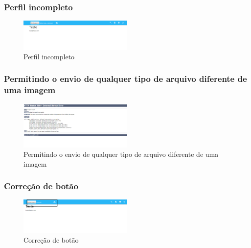 \pagebreak

\subsubsection{Perfil incompleto}
\begin{figure}[ht]
	\centering
	\includegraphics[width=0.5\textwidth]{./imagens/perfil_desarrumado.png}
	\caption{Perfil incompleto}
	\label{fig:casoDeUso}
\end{figure}

\pagebreak

\subsubsection{Permitindo o envio de qualquer tipo de arquivo diferente de uma imagem}
\begin{figure}[ht]
	\centering
	\includegraphics[width=0.5\textwidth]{./imagens/erro_envio.png}
	\caption{Permitindo o envio de qualquer tipo de arquivo diferente de uma imagem}
	\label{fig:casoDeUso}
\end{figure}

\pagebreak

\subsubsection{Correção de botão}
\begin{figure}[ht]
	\centering
	\includegraphics[width=0.5\textwidth]{./imagens/envio_qualquer_arquivo.png}
	\caption{Correção de botão}
	\label{fig:casoDeUso}
\end{figure}

\pagebreak


